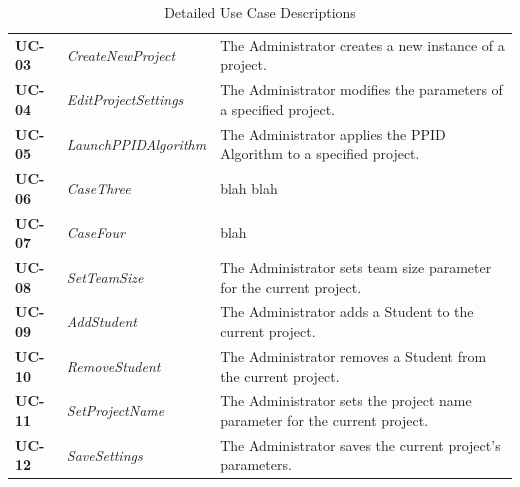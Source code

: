 \documentclass[12pt,letterpaper]{article}
\begin{document}
\begin{table}[H]
\caption{Detailed Use Case Descriptions}
\renewcommand{\arraystretch}{1.5}
\everyrow{\hline}
\begin{tabu} to 
UC-03 & CreateNewProject & The Administrator creates a new instance of a project.\\
UC-04 & EditProjectSettings & The Administrator modifies the parameters of a specified project.\\
UC-05 & LaunchPPIDAlgorithm & The Administrator applies the PPID Algorithm to a specified project.\\
UC-06 & CaseThree & blah blah \\
UC-07 & CaseFour & blah \\
UC-08 & SetTeamSize & The Administrator sets team size parameter for the current project.\\
UC-09 & AddStudent & The Administrator adds a Student to the current project.\\
UC-10 & RemoveStudent & The Administrator removes a Student from the current project.\\
UC-11 & SetProjectName & The Administrator sets the project name parameter for the current project.\\
UC-12 & SaveSettings & The Administrator saves the current project's parameters.\\
\end{tabu}
\end{table}
\end{document}
